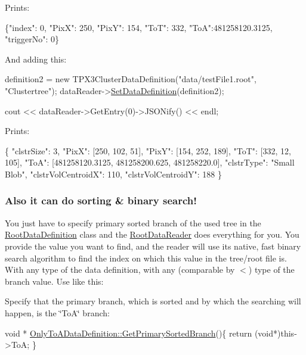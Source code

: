 Prints\+:


\begin{DoxyCode}
\{\textcolor{stringliteral}{"index"}: 0, \textcolor{stringliteral}{"PixX"}: 250, \textcolor{stringliteral}{"PixY"}: 154, \textcolor{stringliteral}{"ToT"}: 332, \textcolor{stringliteral}{"ToA"}:481258120.3125, \textcolor{stringliteral}{"triggerNo"}: 0\}
\end{DoxyCode}


And adding this\+:


\begin{DoxyCode}
definition2 = \textcolor{keyword}{new} TPX3ClusterDataDefinition(\textcolor{stringliteral}{"data/testFile1.root"}, \textcolor{stringliteral}{"Clustertree"});
dataReader->\hyperlink{classRootDataReader_ad670745df69f90ea6578d7c29cab716f}{SetDataDefinition}(definition2);

cout << dataReader->GetEntry(0)->JSONify() << endl;
\end{DoxyCode}


Prints\+:


\begin{DoxyCode}
\{
    \textcolor{stringliteral}{"clstrSize"}: 3, 
    \textcolor{stringliteral}{"PixX"}: [250, 102, 51], 
    \textcolor{stringliteral}{"PixY"}: [154, 252, 189], 
    \textcolor{stringliteral}{"ToT"}: [332, 12, 105], 
    \textcolor{stringliteral}{"ToA"}: [481258120.3125, 481258200.625, 481258220.0], 
    \textcolor{stringliteral}{"clstrType"}: \textcolor{stringliteral}{"Small Blob"}, 
    \textcolor{stringliteral}{"clstrVolCentroidX"}: 110, 
    \textcolor{stringliteral}{"clstrVolCentroidY"}: 188
\}
\end{DoxyCode}


\subsubsection*{Also it can do sorting \& binary search!}

You just have to specify primary sorted branch of the used tree in the \hyperlink{classRootDataDefinition}{Root\+Data\+Definition} class and the \hyperlink{classRootDataReader}{Root\+Data\+Reader} does everything for you. You provide the value you want to find, and the reader will use its native, fast binary search algorithm to find the index on which this value in the tree/root file is. With any type of the data definition, with any (comparable by $<$) type of the branch value. Use like this\+:

Specify that the primary branch, which is sorted and by which the searching will happen, is the \char`\"{}\+To\+A\char`\"{} branch\+: 
\begin{DoxyCode}
\textcolor{keywordtype}{void} * \hyperlink{classOnlyToADataDefinition_af2025f39b59dc8bd50a281f5034ed47a}{OnlyToADataDefinition::GetPrimarySortedBranch}()\{
    \textcolor{keywordflow}{return} (\textcolor{keywordtype}{void}*)this->ToA;
\}
\end{DoxyCode}


